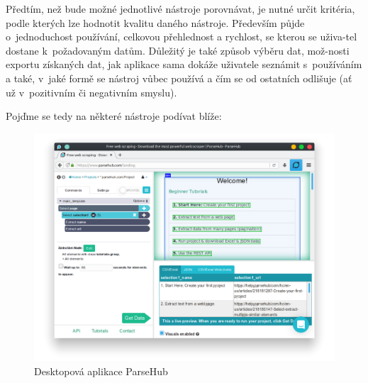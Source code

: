 \documentclass[thesis=B,czech]{FITthesis}[2012/06/26]
\begin{document}
Předtím, než bude možné jednotlivé nástroje porovnávat, je nutné určit kritéria, podle kterých lze hodnotit kvalitu daného nástroje. Především půjde o~jednoduchost používání, celkovou přehlednost a rychlost, se kterou se uživa-tel dostane k~požadovaným datům. Důležitý je také způsob výběru dat, mož-nosti exportu získaných dat, jak aplikace sama dokáže uživatele seznámit s~používáním a také, v~jaké formě se nástroj vůbec používá a čím se od ostatních odlišuje (ať už v~pozitivním či negativním smyslu). 

Poj\v{d}me se tedy na některé nástroje podívat blíže:

\begin{figure}
	\includegraphics[width=\linewidth]{images/ParseHub.png}
	\caption[Desktopová aplikace ParseHub]{Desktopová aplikace ParseHub~\cite[snímek pořídil autor]{parsehub}}
	\label{fig:parseHub}
\end{figure}
\end{document}
